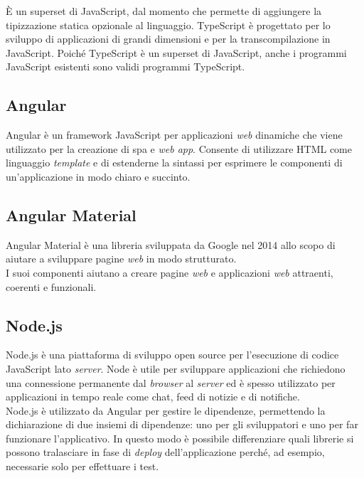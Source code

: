 \noindent È un \gls{superset} di JavaScript, dal momento che permette di
aggiungere
la
tipizzazione
statica opzionale al linguaggio. TypeScript è progettato per lo sviluppo di
applicazioni
di grandi dimensioni e per la \gls{transcompilazione} in JavaScript. Poiché
TypeScript è un \gls{superset} di JavaScript, anche i programmi JavaScript
esistenti sono validi programmi TypeScript. \cite{site-typescript}
\subsection*{Angular}
Angular è un \gls{framework} JavaScript per applicazioni \textit{web}
dinamiche che viene utilizzato per la creazione di \gls{spa} e
\textit{web app}. Consente di utilizzare HTML come linguaggio \textit{template}
e di estenderne la sintassi per esprimere le componenti di un'applicazione in
modo chiaro e succinto. \cite{site-Angular}

\subsection*{Angular Material}
Angular Material è una libreria sviluppata da Google nel 2014 allo scopo di
aiutare a sviluppare pagine \textit{web} in modo strutturato. \\
I suoi componenti aiutano a creare pagine \textit{web} e applicazioni
\textit{web} attraenti, coerenti e funzionali. \cite{site-Angular}

\subsection*{Node.js}
Node.js è una piattaforma di sviluppo open source per l'esecuzione di codice
JavaScript lato \textit{server}. Node è utile per sviluppare applicazioni che
richiedono una connessione permanente dal \textit{browser} al \textit{server}
ed è spesso utilizzato per applicazioni in tempo reale come chat, feed di
notizie e di notifiche.\\
Node.js è utilizzato da Angular per gestire le dipendenze, permettendo la
dichiarazione di due insiemi di dipendenze: uno per gli sviluppatori e uno per
far
funzionare l'applicativo. In questo modo è possibile differenziare quali
librerie si possono tralasciare in fase di \textit{deploy} dell'applicazione
perché, ad esempio, necessarie solo per effettuare i test. \cite{site-node}

